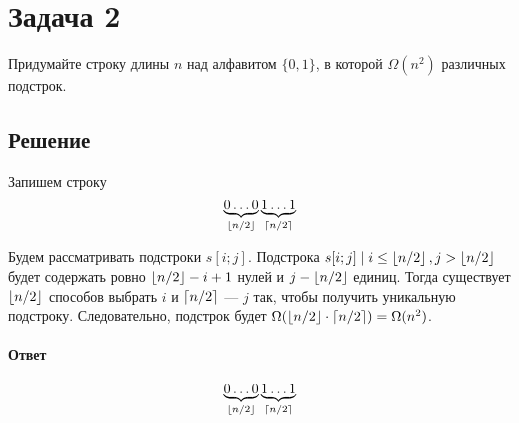 \section{Задача 2}
Придумайте строку длины $n$ над алфавитом $\{0, 1\}$, в которой $\Omega(n^2)$ различных подстрок.

\subsection{Решение}
Запишем строку
\[ \underbrace{0\ldots0}_{\left \lfloor n/2 \right \rfloor}\underbrace{1\ldots1}_{\left \lceil n/2 \right \rceil} \]

Будем рассматривать подстроки $s[i; j]$.
Подстрока $s[i; j] \mid i \leq \left \lfloor n/2 \right \rfloor, j > \left \lfloor n/2 \right \rfloor$
будет содержать ровно $\left \lfloor n/2 \right \rfloor - i + 1$ нулей и $j - \left \lfloor n/2 \right \rfloor$ единиц.
Тогда существует $\left \lfloor n/2 \right \rfloor$ способов выбрать $i$ и $\left \lceil n/2 \right \rceil$ --- $j$
так, чтобы получить уникальную подстроку.
Следовательно, подстрок будет $\Omega(\left \lfloor n/2 \right \rfloor \cdot \left \lceil n/2 \right \rceil) = \Omega(n^2)$.

\paragraph{Ответ}
\[ \underbrace{0\ldots0}_{\left \lfloor n/2 \right \rfloor}\underbrace{1\ldots1}_{\left \lceil n/2 \right \rceil} \]

